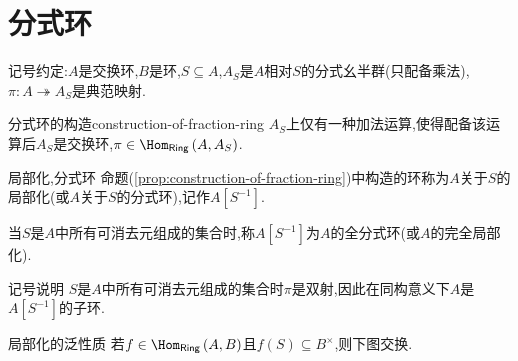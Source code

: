 \section{分式环}

记号约定:$A$是交换环,$B$是环,$S\subseteq A$,$A_{S}$是$A$相对$S$的分式幺半群(只配备乘法),$\pi:A\twoheadrightarrow A_{S}$是典范映射.

\begin{proposition}{分式环的构造}{construction-of-fraction-ring}
	$A_{S}$上仅有一种加法运算,使得配备该运算后$A_{S}$是交换环,$\pi\in\Hom_{\mathsf{Ring}}\left(A,A_{S}\right)$.
\end{proposition}

\begin{definition}{局部化,分式环}{}
	命题(\cref{prop:construction-of-fraction-ring})中构造的环称为$A$关于$S$的局部化(或$A$关于$S$的分式环),记作$A\left[S^{-1}\right]$.
	
	当$S$是$A$中所有可消去元组成的集合时,称$A\left[S^{-1}\right]$为$A$的全分式环(或$A$的完全局部化).
\end{definition}

\begin{remark}{记号说明}{}
	$S$是$A$中所有可消去元组成的集合时$\pi$是双射,因此在同构意义下$A$是$A\left[S^{-1}\right]$的子环.
\end{remark}

\begin{theorem}{局部化的泛性质}{}
	若$f\in\Hom_{\mathsf{Ring}}\left(A,B\right)$且$f\left(S\right)\subseteq B^{\times}$,则下图交换.
	\begin{center}
	\end{center}
\end{theorem}


























